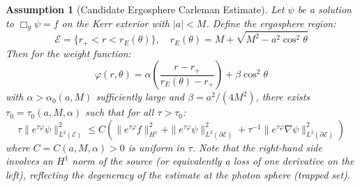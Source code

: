\documentclass[12pt,a4paper]{article}
\newtheorem{assumption}[theorem]{Assumption}
\begin{document}
\begin{assumption}[Candidate Ergosphere Carleman Estimate]\label{thm:carleman}
Let $\psi$ be a solution to $\Box_g \psi = f$ on the Kerr exterior with $|a| < M$. Define the ergosphere region:
\begin{equation}
\mathcal{E} = \{r_+ < r < r_E(\theta)\}, \quad r_E(\theta) = M + \sqrt{M^2 - a^2\cos^2\theta}
\end{equation}
Then for the weight function:
\begin{equation}
\varphi(r, \theta) = \alpha\left(\frac{r - r_+}{r_E(\theta) - r_+}\right) + \beta\cos^2\theta
\end{equation}
with $\alpha > \alpha_0(a,M)$ sufficiently large and $\beta = a^2/(4M^2)$, there exists $\tau_0 = \tau_0(a, M, \alpha)$ such that for all $\tau > \tau_0$:
\begin{equation}\label{eq:carleman-main}
\tau\|e^{\tau\varphi}\psi\|_{L^2(\mathcal{E})}^2 \leq C\left(\|e^{\tau\varphi}f\|_{H^1}^2 + \|e^{\tau\varphi}\psi\|_{L^2(\partial\mathcal{E})}^2 + \tau^{-1}\|e^{\tau\varphi}\nabla\psi\|_{L^2(\partial\mathcal{E})}^2\right)
\end{equation}
where $C = C(a, M, \alpha) > 0$ is uniform in $\tau$. Note that the right-hand side involves an $H^1$ norm of the source (or equivalently a loss of one derivative on the left), reflecting the degeneracy of the estimate at the photon sphere (trapped set).
\end{assumption}
\end{document}
